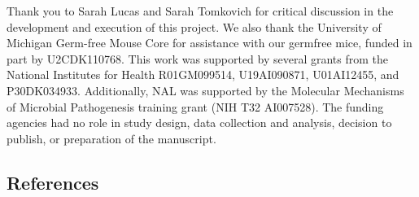 \documentclass[
  12pt,
]{article}
\begin{document}
Thank you to Sarah Lucas and Sarah Tomkovich for critical discussion in
the development and execution of this project. We also thank the
University of Michigan Germ-free Mouse Core for assistance with our
germfree mice, funded in part by U2CDK110768. This work was supported by
several grants from the National Institutes for Health R01GM099514,
U19AI090871, U01AI12455, and P30DK034933. Additionally, NAL was
supported by the Molecular Mechanisms of Microbial Pathogenesis training
grant (NIH T32 AI007528). The funding agencies had no role in study
design, data collection and analysis, decision to publish, or
preparation of the manuscript.

\newpage

\hypertarget{references}{%
\subsection{References}\label{references}}
\end{document}
